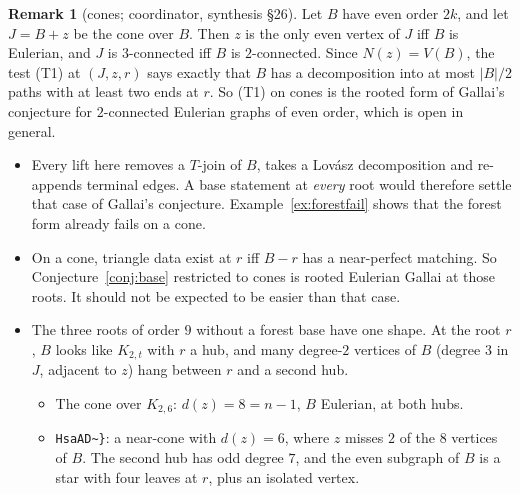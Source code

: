\documentclass[11pt]{amsart}
\theoremstyle{definition}
\newtheorem{remark}[theorem]{Remark}
\begin{document}
\begin{remark}[cones; coordinator, synthesis \S26]\label{rem:cones}
Let $B$ have even order $2k$, and let $J=B+z$ be the cone over $B$. Then $z$ is the only even
vertex of $J$ iff $B$ is Eulerian, and $J$ is $3$-connected iff $B$ is $2$-connected. Since
$N(z)=V(B)$, the test (T1) at $(J,z,r)$ says exactly that $B$ has a decomposition into at most
$|B|/2$ paths with at least two ends at $r$. So (T1) on cones is the rooted form of Gallai's
conjecture for $2$-connected Eulerian graphs of even order, which is open in general.
\begin{itemize}[leftmargin=*]
\item Every lift here removes a $T$-join of $B$, takes a Lov\'asz decomposition and re-appends
terminal edges. A base statement at \emph{every} root would therefore settle that case of Gallai's
conjecture. Example~\ref{ex:forestfail} shows that the forest form already fails on a cone.
\item On a cone, triangle data exist at $r$ iff $B-r$ has a near-perfect matching. So
Conjecture~\ref{conj:base} restricted to cones is rooted Eulerian Gallai at those roots. It should not
be expected to be easier than that case.
\item The three roots of order $9$ without a forest base have one shape. At the root $r$, $B$ looks
like $K_{2,t}$ with $r$ a hub, and many degree-$2$ vertices of $B$ (degree $3$ in $J$, adjacent to
$z$) hang between $r$ and a second hub.
\begin{itemize}
\item The cone over $K_{2,6}$: $d(z)=8=n-1$, $B$ Eulerian, at both hubs.
\item \texttt{HsaAD\textasciitilde\}}: a near-cone with $d(z)=6$, where $z$ misses $2$ of the $8$ vertices
of $B$. The second hub has odd degree $7$, and the even subgraph of $B$ is a star with four leaves at
$r$, plus an isolated vertex.
\end{itemize}
\end{itemize}
\end{remark}
\end{document}
